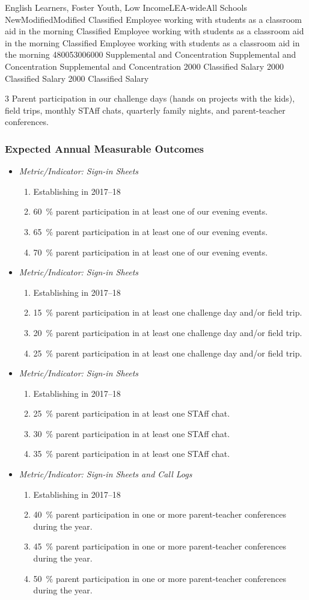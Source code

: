 \documentclass{article}
\makeatletter
\newcounter{goal}[section] %
\newcommand*{\expout}[1]{%
	\expandafter\@expout\csname c@#1\endcsname%
}
\newcommand*{\@expout}[1]{%
	$\ifcase\intcalcAdd{1}{\intcalcMod{\intcalcSub{#1}{1}}{4}}
		\or{\text{Baseline:}}
		\or{\text{2017--18:}}
		\or{\text{2018--19:}}
		\or{\text{2019--20:}}
    \else\@ctrerr\fi$
}
\newcommand{\expoutcome}[5]{
	\item
	{\em Metric/Indicator: #1}
	\begin{enumerate}[label=\expout*]
		\setlength\itemindent{40pt}
		\item #2
		\item #3
		\item #4
		\item #5
	\end{enumerate}
}
\newenvironment{expoutcomes}
	{
		\subsubsection{Expected Annual Measurable Outcomes}
		\begin{itemize}[label={}]
	}
	{\end{itemize}}
\newcounter{action}[goal]
\makeatother
\begin{document}
\begin{planactions}
	\planaction@scope
	{English Learners, Foster Youth, Low Income}{LEA-wide}{All Schools}
	\planaction@action
	{New}{Modified}{Modified}
	{Classified Employee working with students as a classroom aid in the morning}
	{Classified Employee working with students as a classroom aid in the morning}
	{Classified Employee working with students as a classroom aid in the morning}
	\planaction@budget
	{4800}{5300}{6000}
	{Supplemental and Concentration}
	{Supplemental and Concentration}
	{Supplemental and Concentration}
	{\num{2000} Classified Salary}
	{\num{2000} Classified Salary}
	{\num{2000} Classified Salary}
\end{planactions}

	{3}
	{}
	{Parent participation in our challenge days (hands on projects with the kids), field trips, monthly STAff chats, quarterly family nights, and parent-teacher conferences.}

\begin{expoutcomes}
	\expoutcome
	{Sign-in Sheets}
	{Establishing in 2017--18}
	{\SI{60}{\percent} parent participation in at least one of our evening events.}
	{\SI{65}{\percent} parent participation in at least one of our evening events.}
	{\SI{70}{\percent} parent participation in at least one of our evening events.}
	\expoutcome
	{Sign-in Sheets}
	{Establishing in 2017--18}
	{\SI{15}{\percent} parent participation in at least one challenge day and/or field trip.}
	{\SI{20}{\percent} parent participation in at least one challenge day and/or field trip.}
	{\SI{25}{\percent} parent participation in at least one challenge day and/or field trip.}
	\expoutcome
	{Sign-in Sheets}
	{Establishing in 2017--18}
	{\SI{25}{\percent} parent participation in at least one STAff chat.}
	{\SI{30}{\percent} parent participation in at least one STAff chat.}
	{\SI{35}{\percent} parent participation in at least one STAff chat.}
	\expoutcome
	{Sign-in Sheets and Call Logs}
	{Establishing in 2017--18}
	{\SI{40}{\percent} parent participation in one or more parent-teacher conferences during the year.}
	{\SI{45}{\percent} parent participation in one or more parent-teacher conferences during the year.}
	{\SI{50}{\percent} parent participation in one or more parent-teacher conferences during the year.}
\end{expoutcomes}
\end{document}
